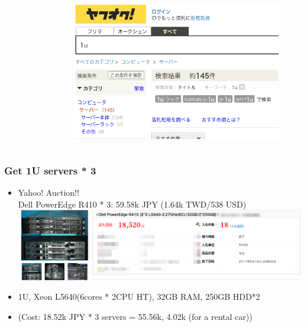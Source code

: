 \documentclass[aspectratio=169,11pt,hyperref={colorlinks=true}]{beamer}
\begin{document}
\begin{frame}
\begin{columns}[T]
\begin{column}{0.45\textwidth}
\begin{figure}
\begin{center}
        \end{center}
      \end{figure}
    \end{column}
    \begin{column}{0.45\textwidth}
      \begin{figure}
        \begin{center}
          \includegraphics[width=1.0\textwidth]{yahoo_auction_1u_large.png}
        \end{center}
      \end{figure}
    \end{column}
  \end{columns}
\end{frame}

\begin{frame}
  \frametitle{Get 1U servers * 3}
  \begin{itemize}
    \item Yahoo! Auction!! \\
      Dell PowerEdge R410 * 3: 59.58k JPY (1.64k TWD/538 USD)\\
      \includegraphics[scale=1.0]{auction_r410.png}\\
    \item[] 1U, Xeon L5640(6cores * 2CPU HT), 32GB RAM, 250GB HDD*2
    \item[] (Cost: 18.52k JPY * 3 servers = 55.56k, 4.02k (for a rental car))
  \end{itemize}
\end{frame}
\end{document}

